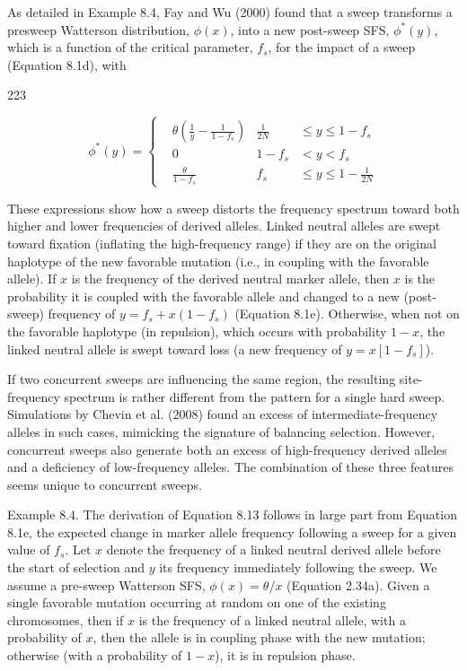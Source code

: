\documentclass{article}
\begin{document}
As detailed in Example 8.4, Fay and Wu (2000) found that a sweep transforms a presweep Watterson distribution,  $ \phi(x) $, into a new post-sweep SFS,  $ \phi^{*}(y) $, which is a function of the critical parameter,  $ f_s $, for the impact of a sweep (Equation 8.1d), with

223

\begin{equation}
\phi^{*}(y)=\left\{\begin{aligned}&\theta\left(\frac{1}{y}-\frac{1}{1-f_{s}}\right)&\frac{1}{2N}&\leq y\leq1-f_{s}\\ &0&1-f_{s}&<y<f_{s}\\ &\frac{\theta}{1-f_{s}}&f_{s}&\leq y\leq1-\frac{1}{2N}\end{aligned}\right.
\tag{8.13}
\label{eq:8_13}
\end{equation}

These expressions show how a sweep distorts the frequency spectrum toward both higher and lower frequencies of derived alleles. Linked neutral alleles are swept toward fixation (inflating the high-frequency range) if they are on the original haplotype of the new favorable mutation (i.e., in coupling with the favorable allele). If $x$ is the frequency of the derived neutral marker allele, then $x$ is the probability it is coupled with the favorable allele and changed to a new (post-sweep) frequency of $y = f_s + x(1 - f_s)$ (Equation 8.1e). Otherwise, when not on the favorable haplotype (in repulsion), which occurs with probability $1 - x$, the linked neutral allele is swept toward loss (a new frequency of $y = x[1 - f_s]$).

If two concurrent sweeps are influencing the same region, the resulting site-frequency spectrum is rather different from the pattern for a single hard sweep. Simulations by Chevin et al. (2008) found an excess of intermediate-frequency alleles in such cases, mimicking the signature of balancing selection. However, concurrent sweeps also generate both an excess of high-frequency derived alleles and a deficiency of low-frequency alleles. The combination of these three features seems unique to concurrent sweeps.

Example 8.4. The derivation of Equation 8.13 follows in large part from Equation 8.1e, the expected change in marker allele frequency following a sweep for a given value of  $ f_s $. Let  $ x $ denote the frequency of a linked neutral derived allele before the start of selection and  $ y $ its frequency immediately following the sweep. We assume a pre-sweep Watterson SFS,  $ \phi(x) = \theta / x $ (Equation 2.34a). Given a single favorable mutation occurring at random on one of the existing chromosomes, then if  $ x $ is the frequency of a linked neutral allele, with a probability of  $ x $, then the allele is in coupling phase with the new mutation; otherwise (with a probability of  $ 1 - x $), it is in repulsion phase.
\end{document}
